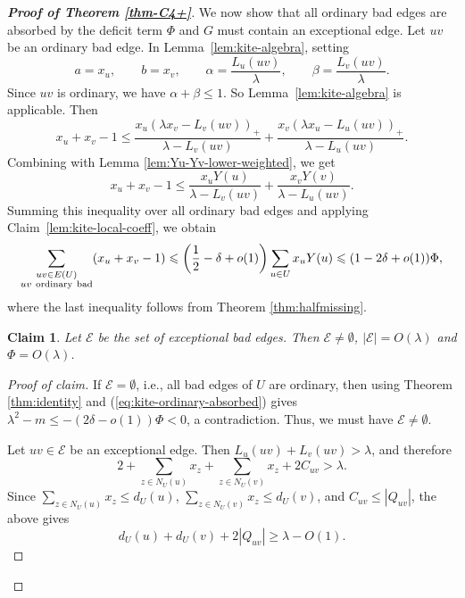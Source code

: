 \documentclass[11pt,a4paper]{article}
\newtheorem{claim}[theorem]{Claim}
\theoremstyle{definition}
\theoremstyle{plain}
\renewcommand{\le}{\leqslant}
\renewcommand{\ge}{\geqslant}
\begin{document}
\begin{proof}[{\bf Proof of Theorem \ref{thm-C4+}}]
We now show that all ordinary bad edges are absorbed by the deficit term \(\Phi\) and  $G$ must contain an exceptional edge. 
Let \(uv\) be an ordinary bad edge.  In Lemma~\ref{lem:kite-algebra}, setting 
\[
        a=x_u,\qquad b=x_v,\qquad
        \alpha=\frac{L_u(uv)}{\lambda},\qquad
        \beta=\frac{L_v(uv)}{\lambda}.
\]
Since \(uv\) is ordinary, we have \(\alpha+\beta\le1\). So Lemma~\ref{lem:kite-algebra} is applicable. 
Then 
\[ x_u+x_v -1 \le \frac{x_u (\lambda x_v - L_v(uv))_+}{\lambda - L_v(uv)} + \frac{x_v(\lambda x_u -L_u(uv))_+}{\lambda - L_u(uv)}.   \]
Combining with 
Lemma \ref{lem:Yu-Yv-lower-weighted}, 
we get 
\[
        x_u+x_v-1
        \le
        \frac{x_uY(u)}{\lambda-L_v(uv)}
        +
        \frac{x_vY(v)}{\lambda-L_u(uv)}.
\]
Summing this inequality over all ordinary bad edges and applying
Claim~\ref{lem:kite-local-coeff}, we obtain
\begin{equation}\label{eq:kite-ordinary-absorbed}
        \sum_{\substack{uv\in E(U)\\ uv\ {\rm ordinary\ bad}}}
        (x_u+x_v-1)
        \le
        \left(\frac12-\delta+o(1)\right)
        \sum_{u\in U}x_uY(u)                      \le
        (1-2\delta+o(1))\Phi,
\end{equation}
where the last inequality follows from Theorem \ref{thm:halfmissing}.



\begin{claim}  \label{cl:big-O}
Let \(\mathcal E\) be the set of exceptional bad edges. 
    Then $\mathcal{E}\neq \emptyset$, $|\mathcal E|=O(\lambda)$ and $\Phi = O(\lambda)$. 
\end{claim}

\begin{proof}[Proof of claim]
 If \(\mathcal E=\emptyset\), i.e., all bad edges of $U$ are ordinary, 
then using 
Theorem \ref{thm:identity} and (\ref{eq:kite-ordinary-absorbed}) gives
$  \lambda^2-m
        \le
        -(2\delta-o(1))\Phi < 0$, 
a contradiction.  
Thus, we must have \(\mathcal E\neq\emptyset\). 

Let \(uv\in\mathcal E\) be an exceptional edge.  Then
$  L_u(uv)+L_v(uv)>\lambda$, 
and therefore
\[
        2+\sum_{z\in N_U(u)}x_z + 
        \sum_{z\in N_U(v)}x_z 
        +2C_{uv}>\lambda.
\]
Since \( \sum_{z\in N_U(u)}x_z \le d_U(u)\), \( \sum_{z\in N_U(v)}x_z \le d_U(v)\), and \(C_{uv}\le |Q_{uv}|\), the above gives
\begin{equation}\label{eq:kite-exceptional-size}
        d_U(u)+d_U(v)+2|Q_{uv}| \ge \lambda-O(1).
\end{equation}


\end{proof}
\end{proof}
\end{document}

